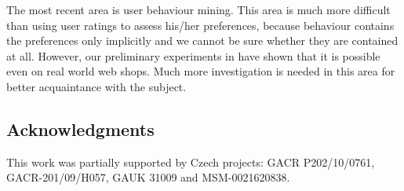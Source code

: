 \documentclass[runningheads,a4paper]{llncs}
\begin{document}
The most recent area is user behaviour mining. This area is much more difficult than using user ratings to assess his/her preferences, because behaviour contains the preferences only implicitly and we cannot be sure whether they are contained at all. However, our preliminary experiments in \cite{biblio:Peska} have shown that it is possible even on real world web shops. Much more investigation is needed in this area for better acquaintance with the subject. 




\subsection*{Acknowledgments}
This work was partially supported by Czech projects: GACR P202/10/0761, GACR-201/09/H057, GAUK 31009 and MSM-0021620838.



\end{document}
